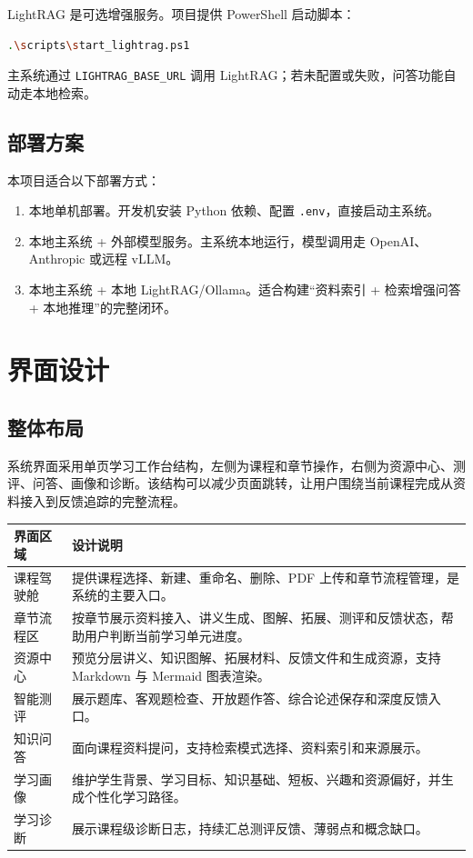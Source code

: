 \documentclass[UTF8,fontset=windows,zihao=-4,openany]{ctexrep}
\begin{document}
LightRAG 是可选增强服务。项目提供 PowerShell 启动脚本：
\begin{lstlisting}[language=bash]
.\scripts\start_lightrag.ps1
\end{lstlisting}

主系统通过 \texttt{LIGHTRAG\_BASE\_URL} 调用 LightRAG；若未配置或失败，问答功能自动走本地检索。

\section{部署方案}

本项目适合以下部署方式：
\begin{enumerate}
  \item 本地单机部署。开发机安装 Python 依赖、配置 \texttt{.env}，直接启动主系统。
  \item 本地主系统 + 外部模型服务。主系统本地运行，模型调用走 OpenAI、Anthropic 或远程 vLLM。
  \item 本地主系统 + 本地 LightRAG/Ollama。适合构建“资料索引 + 检索增强问答 + 本地推理”的完整闭环。
\end{enumerate}

\chapter{界面设计}

\section{整体布局}

系统界面采用单页学习工作台结构，左侧为课程和章节操作，右侧为资源中心、测评、问答、画像和诊断。该结构可以减少页面跳转，让用户围绕当前课程完成从资料接入到反馈追踪的完整流程。

\begin{longtable}{p{}p{}}
\toprule
界面区域 & 设计说明\\
\midrule
课程驾驶舱 & 提供课程选择、新建、重命名、删除、PDF 上传和章节流程管理，是系统的主要入口。\\
章节流程区 & 按章节展示资料接入、讲义生成、图解、拓展、测评和反馈状态，帮助用户判断当前学习单元进度。\\
资源中心 & 预览分层讲义、知识图解、拓展材料、反馈文件和生成资源，支持 Markdown 与 Mermaid 图表渲染。\\
智能测评 & 展示题库、客观题检查、开放题作答、综合论述保存和深度反馈入口。\\
知识问答 & 面向课程资料提问，支持检索模式选择、资料索引和来源展示。\\
学习画像 & 维护学生背景、学习目标、知识基础、短板、兴趣和资源偏好，并生成个性化学习路径。\\
学习诊断 & 展示课程级诊断日志，持续汇总测评反馈、薄弱点和概念缺口。\\
\bottomrule
\end{longtable}
\end{document}
